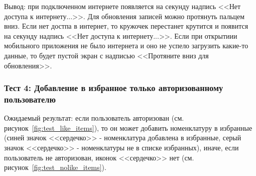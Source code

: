 Вывод: при подключенном интернете появляется на секунду надпись <<Нет доступа к интернету...>>.
Для обновления записей можно протянуть пальцем вниз. Если нет достпа в интернет,
то кружочек перестанет крутится и появится на секунду надпись <<Нет доступа к интернету...>>.
Если при открытиии мобильного приложения не было интернета и оно не успело загрузить какие-то данные, то будет пустой экран с надписью
<<Протяните вниз для обновления>>.

\subsubsection*{Тест 4: Добавление в избранное только авторизованному пользователю}

Ожидаемый результат: если пользователь авторизован (см. рисунок~\ref{fig:test_like_items}), то он может добавить номенклатуру в избранные
(синей значок <<сердечко>> - номенклатура добавлена в избранные,
серый значок <<сердечко>> - номенклатуры не в списке избранных),
иначе, если пользователь не авторизован, иконок <<сердечко>> нет (см. рисунок~\ref{fig:test_nolike_items}).

